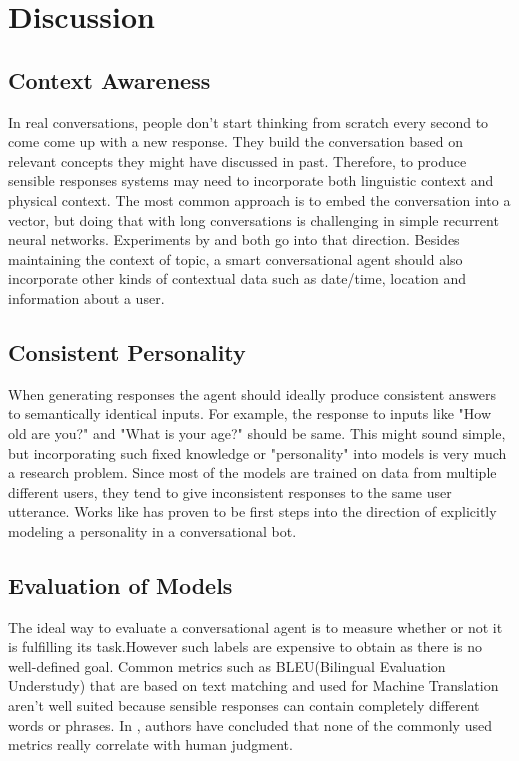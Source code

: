 \documentclass[letterpaper] {article} %
\begin{document}
\section{Discussion}
\subsection{Context Awareness}
In real conversations, people don't start thinking from scratch every second to come come up with a new response. They build the conversation based on relevant concepts they might have discussed in past. Therefore, to produce sensible responses systems may need to incorporate both linguistic context and physical context. The most common approach is to embed the conversation into a vector, but doing that with long conversations is challenging in simple recurrent neural networks. Experiments by \cite{serban2016building} and \cite{yao2015attention} both go into that direction. Besides maintaining the context of topic, a smart conversational agent should also incorporate other kinds of contextual data such as date/time, location and information about a user.

\subsection{Consistent Personality}
When generating responses the agent should ideally produce consistent answers to semantically identical inputs. For example, the response to inputs like "How old are you?" and "What is your age?" should be same. This might sound simple, but incorporating such fixed knowledge or "personality" into models is very much a research problem. Since most of the models are trained on data from multiple different users, they tend to give inconsistent responses to the same user utterance. Works like \cite{li2016persona} has proven to be first steps into the direction of explicitly modeling a personality in a conversational bot.
\subsection{Evaluation of Models}
The ideal way to evaluate a conversational agent is to measure whether or not it is fulfilling its task.However such labels are expensive to obtain as there is no well-defined goal. Common metrics such as BLEU(Bilingual Evaluation Understudy) that are based on text matching and used for Machine Translation aren’t well suited because sensible responses can contain completely different words or phrases. In \cite{liu2016not}, authors have concluded that none of the commonly used metrics really correlate with human judgment.
\end{document}
